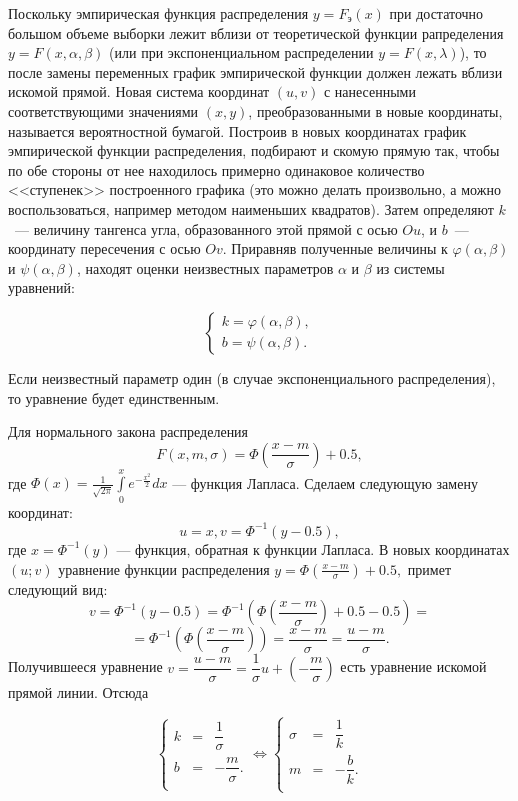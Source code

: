 \par
Поскольку эмпирическая функция распределения $y = F_\text{э}(x)$ при 
достаточно большом объеме выборки лежит вблизи от теоретической функции 
рапределения $y = F(x, \alpha, \beta)$ (или при экспоненциальном 
распределении $y = F(x, \lambda)$), то после замены переменных 
график эмпирической функции должен лежать вблизи искомой прямой. 
Новая система координат $(u, v)$ с нанесенными соответствующими 
значениями $(x, y)$, преобразованными в новые координаты, называется 
вероятностной бумагой. Построив в новых координатах график эмпирической 
функции распределения, подбирают и скомую прямую так, чтобы по обе 
стороны от нее находилось примерно одинаковое количество <<ступенек>> 
построенного графика (это можно делать произвольно, а можно 
воспользоваться, например методом наименьших квадратов). Затем определяют 
$k$~--- величину тангенса угла, образованного этой прямой с осью $Ou$, 
и $b$~--- координату пересечения с осью $Ov$. Приравняв полученные величины 
к $\varphi(\alpha, \beta)$ и $\psi(\alpha, \beta)$, находят оценки 
неизвестных параметров $\alpha$ и $\beta$ из системы уравнений:

$$ 
\begin{cases}
 k = \varphi(\alpha, \beta),\\
 b = \psi(\alpha, \beta).
\end{cases} 
$$

\par
Если неизвестный параметр один (в случае экспоненциального распределения), то 
уравнение будет единственным.

\par
Для нормального закона распределения 
$$  
	F(x, m, \sigma) = \Phi \left( \frac{x-m}{\sigma} \right)  + 0.5,
$$
где $ \Phi(x) = \frac{1}{\sqrt{2 \pi}} \int\limits_{0}^{x} {e^{-\frac{x^2}{2}}} dx$ --- функция Лапласа. Сделаем следующую
замену координат:
$$  
	u = x{,} v = \Phi^{-1}(y-0.5),
$$
где $ x = \Phi^{-1}(y) $ --- функция, обратная к функции Лапласа. В новых координатах $ (u;v) $ уравнение функции распределения $ y = \Phi(\frac{x-m}{\sigma}) + 0.5, $ примет следующий вид:
$$  
	v = \Phi^{-1}(y-0.5) = \Phi^{-1}\left( \Phi \left( \frac{x-m}{\sigma} \right)  + 0.5 - 0.5\right)  = 
$$
$$
	= \Phi^{-1}\left( \Phi \left( \frac{x-m}{\sigma} \right)\right)  = \frac{x-m}{\sigma} = \frac{u-m}{\sigma}.
$$
Получившееся уравнение $ v = \dfrac{u-m}{\sigma} = \dfrac{1}{\sigma} u + (-\dfrac{m}{\sigma})  $
есть уравнение искомой прямой линии. Отсюда

$$
\left\{
\begin{array}{rcl}
k&=&\dfrac{1}{\sigma}\\
b & = &-\dfrac{m}{\sigma}.\\
\end{array}
\right.
\Longleftrightarrow
\left\{
\begin{array}{rcl}
\sigma&=&\dfrac{1}{k}\\
m & = &-\dfrac{b}{k}.\\
\end{array}
\right.
$$

